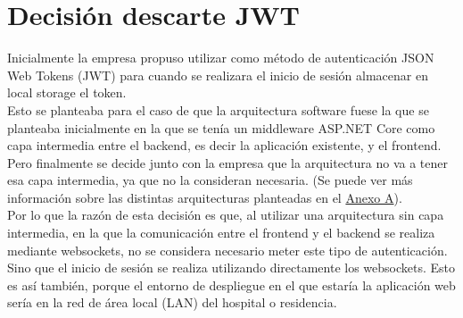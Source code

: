 \chapter{Decisión descarte JWT}
\label{anexo-c}

Inicialmente la empresa propuso utilizar como método de autenticación JSON Web Tokens (JWT) \cite{jwt} para cuando se realizara el inicio de sesión almacenar en local storage el token.\\

Esto se planteaba para el caso de que la arquitectura software fuese la que se planteaba inicialmente en la que se tenía un middleware ASP.NET Core como capa intermedia entre el backend, es decir la aplicación existente, y el frontend. Pero finalmente se decide junto con la empresa que la arquitectura no va a tener esa capa intermedia, ya que no la consideran necesaria. (Se puede ver más información sobre las distintas arquitecturas planteadas en el \hyperref[anexo-a]{Anexo A}). \\

Por lo que la razón de esta decisión es que, al utilizar una arquitectura sin capa intermedia, en la que la comunicación entre el frontend y el backend se realiza mediante websockets, no se considera necesario meter este tipo de autenticación. Sino que el inicio de sesión se realiza utilizando directamente los websockets. Esto es así también, porque el entorno de despliegue en el que estaría la aplicación web sería en la red de área local (LAN) del hospital o residencia.
